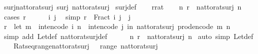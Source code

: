 \begin{isabellebody}
\isanewline
{}\isamarkupfalse%
\ surj{\isacharunderscore}nat{\isacharunderscore}to{\isacharunderscore}rat{\isacharunderscore}surj{\isacharcolon}\ {\isachardoublequoteopen}surj\ nat{\isacharunderscore}to{\isacharunderscore}rat{\isacharunderscore}surj{\isachardoublequoteclose}\isanewline
%
\isadelimproof
%
\endisadelimproof
%
\isatagproof
{}\isamarkupfalse%
\ surj{\isacharunderscore}def\isanewline
{}\isamarkupfalse%
\isanewline
\ \ \isamarkupfalse%
\ r{\isacharcolon}{\isacharcolon}rat\isanewline
\ \ \isamarkupfalse%
\ {\isachardoublequoteopen}{\isasymexists}n{\isachardot}\ r\ {\isacharequal}\ nat{\isacharunderscore}to{\isacharunderscore}rat{\isacharunderscore}surj\ n{\isachardoublequoteclose}\isanewline
\ \ \isamarkupfalse%
\ {\isacharparenleft}cases\ r{\isacharparenright}\isanewline
\ \ \ \ \isamarkupfalse%
\ i\ j\ \isamarkupfalse%
\ {\isacharbrackleft}simp{\isacharbrackright}{\isacharcolon}\ {\isachardoublequoteopen}r\ {\isacharequal}\ Fract\ i\ j{\isachardoublequoteclose}\ \ {\isachardoublequoteopen}j\ {\isachargreater}\ {}{\isachardoublequoteclose}\isanewline
\ \ \ \ \isamarkupfalse%
\ {\isachardoublequoteopen}r\ {\isacharequal}\ {\isacharparenleft}let\ m\ {\isacharequal}\ int{\isacharunderscore}encode\ i{\isacharsemicolon}\ n\ {\isacharequal}\ int{\isacharunderscore}encode\ j\ in\ nat{\isacharunderscore}to{\isacharunderscore}rat{\isacharunderscore}surj\ {\isacharparenleft}prod{\isacharunderscore}encode\ {\isacharparenleft}m{\isacharcomma}\ n{\isacharparenright}{\isacharparenright}{\isacharparenright}{\isachardoublequoteclose}\isanewline
\ \ \ \ \ \ \isamarkupfalse%
\ {\isacharparenleft}simp\ add{\isacharcolon}\ Let{\isacharunderscore}def\ nat{\isacharunderscore}to{\isacharunderscore}rat{\isacharunderscore}surj{\isacharunderscore}def{\isacharparenright}\isanewline
\ \ \ \ \isamarkupfalse%
\ {\isachardoublequoteopen}{\isasymexists}n{\isachardot}\ r\ {\isacharequal}\ nat{\isacharunderscore}to{\isacharunderscore}rat{\isacharunderscore}surj\ n{\isachardoublequoteclose}\ \isamarkupfalse%
{\isacharparenleft}auto\ simp{\isacharcolon}\ Let{\isacharunderscore}def{\isacharparenright}\isanewline
\ \ \isamarkupfalse%
\isanewline
{}\isamarkupfalse%
%
\endisatagproof
{\isafoldproof}%
%
\isadelimproof
\isanewline
%
\endisadelimproof
\isanewline
{}\isamarkupfalse%
\ Rats{\isacharunderscore}eq{\isacharunderscore}range{\isacharunderscore}nat{\isacharunderscore}to{\isacharunderscore}rat{\isacharunderscore}surj{\isacharcolon}\ {\isachardoublequoteopen}{\isasymrat}\ {\isacharequal}\ range\ nat{\isacharunderscore}to{\isacharunderscore}rat{\isacharunderscore}surj{\isachardoublequoteclose}\isanewline

\end{isabellebody}
